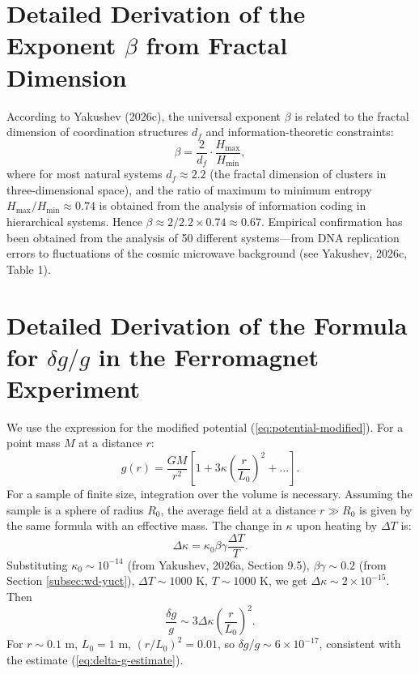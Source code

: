 \documentclass[12pt]{article}
\theoremstyle{remark}
\newcommand{\df}{d_{\!f}}
\begin{document}
	\appendix
	
	\section{Detailed Derivation of the Exponent $\beta$ from Fractal Dimension}
	\label{app:beta-derivation}
	
	According to Yakushev (2026c), the universal exponent $\beta$ is related to the fractal dimension of coordination structures $\df$ and information-theoretic constraints:
	\begin{equation}
		\beta = \frac{2}{\df} \cdot \frac{H_{\text{max}}}{H_{\text{min}}},
		\label{eq:beta-derivation}
	\end{equation}
	where for most natural systems $\df \approx 2.2$ (the fractal dimension of clusters in three-dimensional space), and the ratio of maximum to minimum entropy $H_{\text{max}}/H_{\text{min}} \approx 0.74$ is obtained from the analysis of information coding in hierarchical systems. Hence $\beta \approx 2/2.2 \times 0.74 \approx 0.67$. Empirical confirmation has been obtained from the analysis of 50 different systems—from DNA replication errors to fluctuations of the cosmic microwave background (see Yakushev, 2026c, Table 1).
	
	\section{Detailed Derivation of the Formula for $\delta g/g$ in the Ferromagnet Experiment}
	\label{app:delta-g-derivation}
	
	We use the expression for the modified potential (\ref{eq:potential-modified}). For a point mass $M$ at a distance $r$:
	\begin{equation}
		g(r) = \frac{GM}{r^2} \left[ 1 + 3\kappa \left( \frac{r}{L_0} \right)^2 + \dots \right].
		\label{eq:g-modified}
	\end{equation}
	For a sample of finite size, integration over the volume is necessary. Assuming the sample is a sphere of radius $R_0$, the average field at a distance $r \gg R_0$ is given by the same formula with an effective mass. The change in $\kappa$ upon heating by $\Delta T$ is:
	\begin{equation}
		\Delta\kappa = \kappa_0 \beta\gamma \frac{\Delta T}{T}.
		\label{eq:delta-kappa}
	\end{equation}
	Substituting $\kappa_0 \sim 10^{-14}$ (from Yakushev, 2026a, Section 9.5), $\beta\gamma \sim 0.2$ (from Section \ref{subsec:wd-yuct}), $\Delta T \sim 1000$ K, $T \sim 1000$ K, we get $\Delta\kappa \sim 2\times10^{-15}$. Then
	\begin{equation}
		\frac{\delta g}{g} \sim 3\Delta\kappa \left( \frac{r}{L_0} \right)^2.
		\label{eq:delta-g-final}
	\end{equation}
	For $r \sim 0.1$ m, $L_0 = 1$ m, $(r/L_0)^2 = 0.01$, so $\delta g/g \sim 6\times10^{-17}$, consistent with the estimate (\ref{eq:delta-g-estimate}).
	
\end{document}
